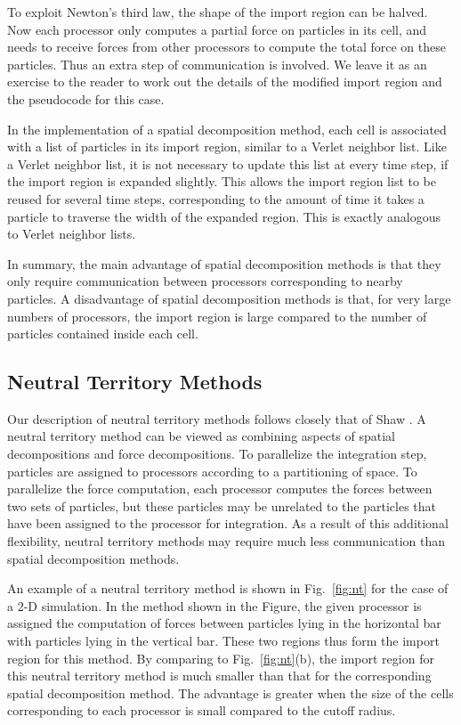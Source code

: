 To exploit Newton's third law, the shape of the import region can be halved.
Now each processor only computes a partial force on particles in its cell, and 
needs to receive forces from other processors to compute the total force
on these particles.  Thus an extra step of communication is involved.
We leave it as an exercise to the reader to work out the details of the
modified import region and the pseudocode for this case.

In the implementation of a spatial decomposition method, each cell is
associated with a list of particles in its import region, similar to a 
Verlet neighbor list.  Like a Verlet neighbor list, it is not necessary
to update this list at every time step, if the import region is expanded
slightly.  This allows the import region list to be reused for several
time steps, corresponding to the amount of time it takes a particle 
to traverse the width of the expanded region.  This is exactly analogous
to Verlet neighbor lists.

In summary, the main advantage of spatial decomposition methods is
that they only require communication between processors corresponding
to nearby particles.  A disadvantage of spatial decomposition methods
is that, for very large numbers of processors, the import region
is large compared to the number of particles contained inside each cell.

\subsection{Neutral Territory Methods}

Our description of neutral territory methods follows closely
that of Shaw \cite{shaw}.  
A neutral territory method can be viewed as combining aspects of
spatial decompositions and force decompositions.  To parallelize
the integration step, particles are assigned to processors 
according to a partitioning of space.  To parallelize the 
force computation, each processor computes the forces between
two sets of particles, but these particles may be unrelated
to the particles that have been assigned to the processor for
integration.  As a result of this additional flexibility,
neutral territory methods may require much less communication
than spatial decomposition methods.

An example of a neutral territory method is shown in Fig.~\ref{fig:nt}
for the case of a 2-D simulation.
In the method shown in the Figure, the given processor is assigned
the computation of forces between particles lying in the horizontal
bar with particles lying in the vertical bar.  These two regions thus
form the import region for this method.  By comparing to Fig.~\ref{fig:nt}(b),
the import region for this neutral territory method is much smaller
than that for the corresponding spatial decomposition method.
The advantage is greater when the size of the cells corresponding to
each processor is small compared to the cutoff radius.

